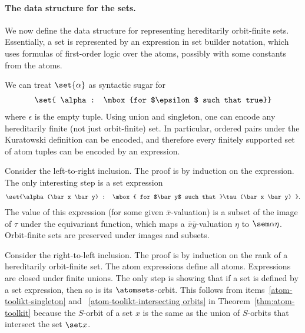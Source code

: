 \paragraph*{The data structure for the sets.}
We now define the data structure for representing hereditarily orbit-finite sets. Essentially, a set is represented by an expression in set builder notation, which uses formulas of first-order logic over the atoms, possibly with some constants from the atoms.







\begin{ourexample}\label{example:expressions-singleton} We can treat $\set{\alpha}$ as syntactic sugar for
	\begin{align*}
		\set{ \alpha : \mbox{for $\epsilon$ such that true}}
	\end{align*}
	where $\epsilon$ is the empty tuple. 
	Using union and singleton, one can encode any hereditarily finite (not just orbit-finite) set. In particular, ordered pairs under the Kuratowski definition can be encoded, and therefore every finitely supported set of atom tuples can be encoded by an expression.
\end{ourexample}







{Consider the left-to-right inclusion. The proof is by induction on the expression. The only interesting step is a set expression
\begin{align*}
	\set{\alpha(\bar x \bar y) : \mbox{ for $\bar y$ such that }\tau(\bar x \bar y) }.
\end{align*}
The value of this expression (for some given $\bar x$-valuation) is a subset of the image of $\tau$ under the equivariant function, which maps a $\bar x\bar y$-valuation $\eta$ to $\sem \alpha \eta$. Orbit-finite sets are preserved under images and subsets.

Consider the right-to-left inclusion. The proof is by induction on the rank of a hereditarily orbit-finite set. The atom expressions define all atoms. Expressions are closed under finite unions. The only step is showing that if a set is defined by a set expression, then so is its $\atomsets$-orbit. This follows from items~\ref{atom-toolikt-singleton} and ~\ref{atom-toolikt-intersecting orbits} in Theorem~\ref{thm:atom-toolkit} because the $S$-orbit of a set $x$ is the same as the union of $S$-orbits that intersect the set $\set x$.
}


